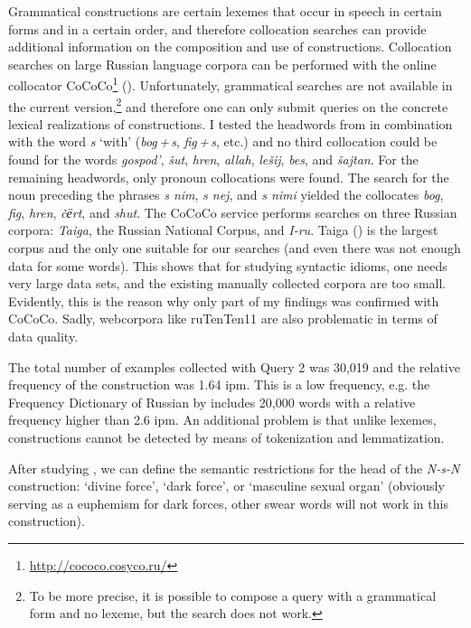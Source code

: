 \documentclass[output=paper]{langscibook}
\begin{document}
Grammatical constructions are certain lexemes that occur in speech in certain forms and in a certain order, and therefore collocation searches can provide additional information on the composition and use of constructions. Collocation searches on large Russian language corpora can be performed with the online collocator CoCoCo\footnote{\url{http://cococo.cosyco.ru/}} (\citealt{KopotevEtAl2016,Kormacheva2020}). Unfortunately, grammatical searches are not available in the current version,\footnote{To be more precise, it is possible to compose a query with a grammatical form and no lexeme, but the search does not work.} and therefore one can only submit queries on the concrete lexical realizations of constructions. I tested the headwords from  in combination with the word \textit{s} ‘with’ (\textit{bog\,+\,s}, \textit{fig\,+\,s}, etc.) and no third collocation could be found for the words \textit{gospod’}, \textit{šut}, \textit{hren}, \textit{allah}, \textit{lešij}, \textit{bes}, and \textit{šajtan}. For the remaining headwords, only pronoun collocations were found. The search for the noun preceding the phrases \textit{s nim}, \textit{s nej}, and \textit{s nimi} yielded the collocates \textit{bog}, \textit{fig}, \textit{hren}, \textit{č{ёrt}}, and \textit{shut}. The CoCoCo service performs searches on three Russian corpora: \textit{Taiga}, the Russian National Corpus, and \textit{I-ru}. Taiga (\citealt{ShavrinaShapovalova2017}) is the largest corpus and the only one suitable for our searches (and even there was not enough data for some words). This shows that for studying syntactic idioms, one needs very large data sets, and the existing manually collected corpora are too small. Evidently, this is the reason why only part of my findings was confirmed with CoCoCo. Sadly, webcorpora like ruTenTen11 are also problematic in terms of data quality.

The total number of examples collected with Query 2 was 30,019 and the relative frequency of the construction was 1.64 ipm. This is a low frequency, e.g. the Frequency Dictionary of Russian by \citet{LjashevskajaSharov2009} includes 20,000 words with a relative frequency higher than 2.6 ipm. An additional problem is that unlike lexemes, constructions cannot be detected by means of tokenization and lemmatization.

After studying , we can define the semantic restrictions for the head of the \textit{N-s-N} construction: ‘divine force’, ‘dark force’, or ‘masculine sexual organ’ (obviously serving as a euphemism for dark forces, other swear words will not work in this construction).
\end{document}
